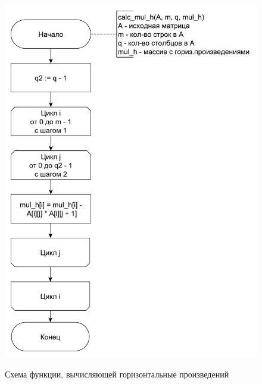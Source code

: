 \documentclass[a4paper,14pt]{article}
\begin{document}
	    	    \begin{figure}[h!]
	    	\begin{center}
	    		{\includegraphics[scale = 0.5]{schema02.pdf}}
	    		\caption{Схема функции, вычисляющей горизонтальные произведений}
	    		\label{fig:schema_h}
	    	\end{center}
	    \end{figure}
	    
\end{document}
